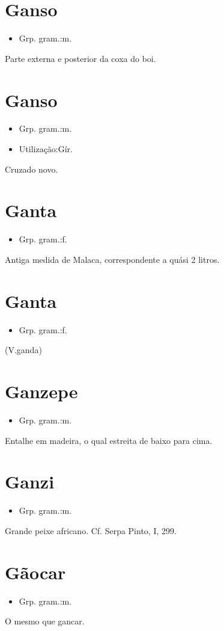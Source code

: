 \section{Ganso}
\begin{itemize}
\item {Grp. gram.:m.}
\end{itemize}
Parte externa e posterior da coxa do boi.
\section{Ganso}
\begin{itemize}
\item {Grp. gram.:m.}
\end{itemize}
\begin{itemize}
\item {Utilização:Gír.}
\end{itemize}
Cruzado novo.
\section{Ganta}
\begin{itemize}
\item {Grp. gram.:f.}
\end{itemize}
Antiga medida de Malaca, correspondente a quási 2 litros.
\section{Ganta}
\begin{itemize}
\item {Grp. gram.:f.}
\end{itemize}
(V.ganda)
\section{Ganzepe}
\begin{itemize}
\item {Grp. gram.:m.}
\end{itemize}
Entalhe em madeira, o qual estreita de baixo para cima.
\section{Ganzi}
\begin{itemize}
\item {Grp. gram.:m.}
\end{itemize}
Grande peixe africano. Cf. Serpa Pinto, I, 299.
\section{Gãocar}
\begin{itemize}
\item {Grp. gram.:m.}
\end{itemize}
O mesmo que \textunderscore gancar\textunderscore .
